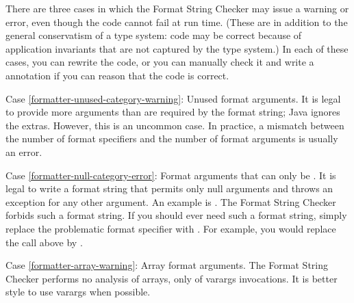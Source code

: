 
There are three cases in which the Format String Checker may issue a
warning or error, even though the code cannot fail at run time.
(These are in addition to the general conservatism of a type system:  code
may be correct because of application invariants that are not captured by
the type system.)
In each of these cases, you can rewrite the code, or you can manually check
it and write a  annotation if you can reason that
the code is correct.


Case \ref{formatter-unused-category-warning}:
  Unused format arguments.  It is legal to provide more arguments than are
  required by the format string; Java ignores the extras.  However, this is
  an uncommon case.  In practice, a mismatch between the number of format
  specifiers and the number of format arguments is usually an error.

Case \ref{formatter-null-category-error}:
  Format arguments that can only be .
  It is legal to write a format string that permits only null arguments and
  throws an exception for any other argument.  An example is
  .
  The Format String Checker forbids such a format string.
  If you should ever need such a format string, simply replace the problematic
  format specifier with .  For example, you would replace the
  call above by .

Case \ref{formatter-array-warning}:
  Array format arguments.
  The Format String Checker performs no analysis of
  arrays, only of varargs invocations.  It is better style to use varargs
  when possible.


